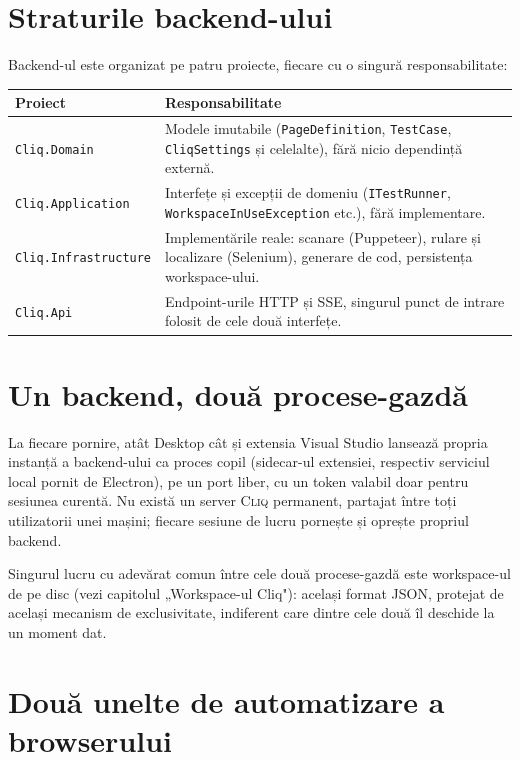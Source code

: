\documentclass[12pt,a4paper]{report}
\newcommand{\File}[1]{\nolinkurl{#1}}
\newcommand{\Cliq}{\textsc{Cliq}}
\begin{document}
\section{Straturile backend-ului}

Backend-ul este organizat pe patru proiecte, fiecare cu o singură responsabilitate:

\begin{tabularx}{\textwidth}{@{}p{3.6cm}Y@{}}
\toprule \textbf{Proiect} & \textbf{Responsabilitate} \\
\midrule
\File{Cliq.Domain} & Modele imutabile (\File{PageDefinition}, \File{TestCase}, \File{CliqSettings} și celelalte), fără nicio dependință externă. \\
\File{Cliq.Application} & Interfețe și excepții de domeniu (\File{ITestRunner}, \File{WorkspaceInUseException} etc.), fără implementare. \\
\File{Cliq.Infrastructure} & Implementările reale: scanare (Puppeteer), rulare și localizare (Selenium), generare de cod, persistența workspace-ului. \\
\File{Cliq.Api} & Endpoint-urile HTTP și SSE, singurul punct de intrare folosit de cele două interfețe. \\
\bottomrule
\end{tabularx}

\section{Un backend, două procese-gazdă}

La fiecare pornire, atât Desktop cât și extensia Visual Studio lansează propria instanță a backend-ului ca proces copil (sidecar-ul extensiei, respectiv serviciul local pornit de Electron), pe un port liber, cu un token valabil doar pentru sesiunea curentă. Nu există un server \Cliq{} permanent, partajat între toți utilizatorii unei mașini; fiecare sesiune de lucru pornește și oprește propriul backend.

Singurul lucru cu adevărat comun între cele două procese-gazdă este workspace-ul de pe disc (vezi capitolul „Workspace-ul Cliq"): același format JSON, protejat de același mecanism de exclusivitate, indiferent care dintre cele două îl deschide la un moment dat.

\section{Două unelte de automatizare a browserului}
\end{document}
